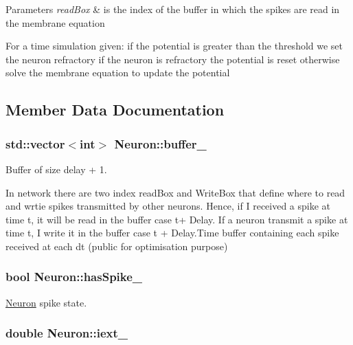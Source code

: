 \begin{DoxyParams}{Parameters}
{\em read\-Box} & is the index of the buffer in which the spikes are read in the membrane equation\\
\hline
\end{DoxyParams}
For a time simulation given\-: if the potential is greater than the threshold we set the neuron refractory if the neuron is refractory the potential is reset otherwise solve the membrane equation to update the potential 

\subsection{Member Data Documentation}
\hypertarget{classNeuron_a8343c4f29429df0b3a843fea612e4bd3}{
\subsubsection[{buffer\-\_\-}]{\setlength{\rightskip}{0pt plus 5cm}std\-::vector$<$int$>$ Neuron\-::buffer\-\_\-}}\label{classNeuron_a8343c4f29429df0b3a843fea612e4bd3}


Buffer of size delay + 1. 

In network there are two index read\-Box and Write\-Box that define where to read and wrtie spikes transmitted by other neurons. Hence, if I received a spike at time t, it will be read in the buffer case t+ Delay. If a neuron transmit a spike at time t, I write it in the buffer case t + Delay.\-Time buffer containing each spike received at each dt (public for optimisation purpose) \hypertarget{classNeuron_a4ad4b397db55b2b0b933e97768dba95a}{
\subsubsection[{has\-Spike\-\_\-}]{\setlength{\rightskip}{0pt plus 5cm}bool Neuron\-::has\-Spike\-\_\-\hspace{0.3cm}{\ttfamily [private]}}}\label{classNeuron_a4ad4b397db55b2b0b933e97768dba95a}


\hyperlink{classNeuron}{Neuron} spike state. 

\hypertarget{classNeuron_a44e7bbc4265ea4e0abe5d8f3d3bc5929}{
\subsubsection[{iext\-\_\-}]{\setlength{\rightskip}{0pt plus 5cm}double Neuron\-::iext\-\_\-\hspace{0.3cm}{\ttfamily [private]}}}\label{classNeuron_a44e7bbc4265ea4e0abe5d8f3d3bc5929}


